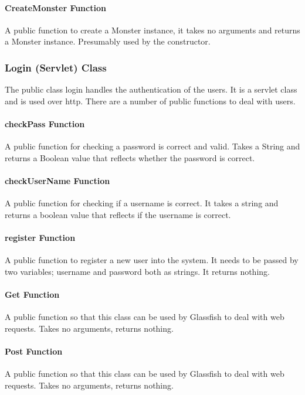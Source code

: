 \documentclass[titlepage]{article}
\begin{document}
\paragraph{CreateMonster Function}
A public function to create a Monster instance, it takes no arguments and returns a Monster instance. Presumably used by the constructor.

\subsubsection{Login (Servlet) Class}
The public class login handles the authentication of the users. It is a servlet class and is used over http. There are a number of public functions to deal with users.

\paragraph{checkPass Function}
A public function for checking a password is correct and valid. Takes a String and returns a Boolean value that reflects whether the password is correct.

\paragraph{checkUserName Function}
A public function for checking if a username is correct. It takes a string and returns a boolean value that reflects if the username is correct.

\paragraph{register Function}
A public function to register a new user into the system. It needs to be passed by two variables; username and password both as strings. It returns nothing.

\paragraph{Get Function}
A public function so that this class can be used by Glassfish to deal with web requests. Takes no arguments, returns nothing.

\paragraph{Post Function}
A public function so that this class can be used by Glassfish to deal with web requests. Takes no arguments, returns nothing.
\end{document}

